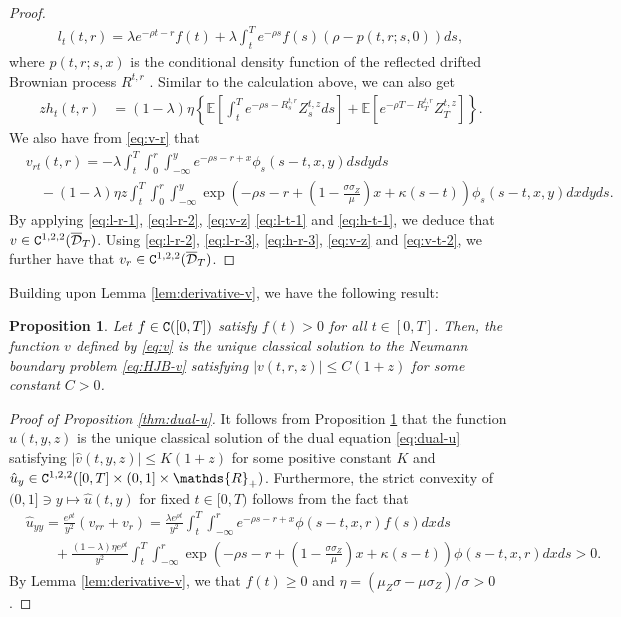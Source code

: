 \documentclass[11pt,times,letter]{article}
\newcommand{\Ex}{ \mathbb{E} }
\newcommand{\R}{\mathds{R}}
\newcommand{\C}{{\tt{C}}}
\numberwithin{equation}{section}
\newtheorem{proposition}[theorem]{Proposition}
\begin{document}
\begin{proof}
\begin{align}
l_t(t,r)=\lambda e^{-\rho t-r}f(t)+\lambda  \int_{t}^{T} e^{-\rho s}f(s)(\rho-p(t,r;s,0))ds,
\end{align}
where $p(t,r;s,x)$ is the conditional density function of the reflected drifted Brownian process $R^{t,r}$ \citep{Vee2004}. Similar to the calculation above, we can also get
\begin{align}\label{eq:h-t-1}
zh_t(t,r)
&=(1-\lambda)\eta \left\{\Ex\left[ \int_{t}^{T} e^{-\rho s-R^{t,r}_{s}} Z_{s}^{t,z} ds\right]+\Ex\left[  e^{-\rho T-R^{t,r}_{T}} Z_{T}^{t,z} \right]\right\}.
\end{align}
We also have from \eqref{eq:v-r} that
\begin{align}\label{eq:v-t-2}
&v_{rt}(t,r)=-\lambda \int_t^T \int_0^r \int_{-\infty}^y e^{-\rho s-r+x}\phi_s(s-t,x,y)dsdyds\\
&\quad-(1-\lambda)\eta z\int_{t}^{T}\int_0^r \int_{-\infty}^{y} \exp\left(-\rho s-r+\left(1-\frac{\sigma\sigma_Z}{\mu}\right)x+\kappa(s-t)\right) \phi_s(s-t,x,y)dx dyds.\nonumber
\end{align}
By applying \eqref{eq:l-r-1}, \eqref{eq:l-r-2}, \eqref{eq:v-z} \eqref{eq:l-t-1} and \eqref{eq:h-t-1},  we deduce that $v \in {\C}^{1,2,2}(\overline{\mathcal{D}}_T)$. Using \eqref{eq:l-r-2}, \eqref{eq:l-r-3}, \eqref{eq:h-r-3}, \eqref{eq:v-z} and \eqref{eq:v-t-2}, we further have that $v_r \in {\C}^{1,2,2}(\overline{\mathcal{D}}_T)$.
\end{proof}


Building upon Lemma \ref{lem:derivative-v}, we have the following result:
\begin{proposition}\label{prop:v}
Let $f\in {\C}([0,T])$ satisfy $f(t)> 0$ for all $t\in[0,T]$. Then, the function $v$ defined by \eqref{eq:v} is the unique classical solution to the Neumann boundary problem \eqref{eq:HJB-v} satisfying $|v(t,r,z)|\leq C(1+z)$ for some constant $C>0$. 
\end{proposition}




\begin{proof}[Proof of Proposition \ref{thm:dual-u}]
It follows from Proposition \ref{prop:v} that the function  $\hat{u}(t,y,z)$ is the  unique classical solution of the dual equation \eqref{eq:dual-u} satisfying $|\hat{v}(t,y,z)|\leq K(1+z)$ for some positive constant $K$ and $\hat{u}_y \in {\C}^{1,2,2}([0,T]\times (0,1]\times\R_+)$. Furthermore, the strict convexity of $(0,1] \ni y \mapsto \hat{u}(t,y)$ for fixed $t \in[0, T) $ follows from the fact that 
\begin{align*}
&\hat{u}_{y y}=\frac{e^{\rho t}}{y^2}(v_{rr}+v_r)=\frac{\lambda e^{\rho t}}{y^2} \int_{t}^{T}\int_{-\infty}^{r} e^{-\rho s-r+x}\phi(s-t,x,r)f(s)dx ds\\
&\qquad+\frac{(1-\lambda)\eta e^{\rho t}}{y^2}\int_{t}^{T}\int_{-\infty}^{r} \exp\left(-\rho s-r+\left(1-\frac{\sigma\sigma_Z}{\mu}\right)x+\kappa(s-t)\right) \phi(s-t,x,r)dx ds>0.
\end{align*} 
By Lemma \ref{lem:derivative-v}, we that $f(t)\geq 0$ and $\eta=(\mu_Z\sigma-\mu\sigma_Z)/\sigma>0$.  
\end{proof}
\end{document}
